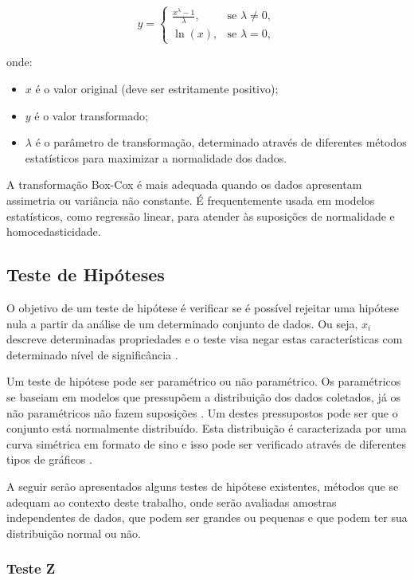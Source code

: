 \[
y = 
\begin{cases} 
\frac{x^\lambda - 1}{\lambda}, & \text{se } \lambda \neq 0, \\
\ln(x), & \text{se } \lambda = 0,
\end{cases}
\]

\noindent
onde:
\begin{itemize}
    \item \( x \) é o valor original (deve ser estritamente positivo);
    \item \( y \) é o valor transformado;
    \item \( \lambda \) é o parâmetro de transformação, determinado através de diferentes métodos estatísticos para maximizar a normalidade dos dados.
\end{itemize}

A transformação Box-Cox é mais adequada quando os dados apresentam assimetria ou variância não constante. É frequentemente usada em modelos estatísticos, como regressão linear, para atender às suposições de normalidade e homocedasticidade.


\subsection{Teste de Hipóteses}

O objetivo de um teste de hipótese é verificar se é possível rejeitar uma hipótese nula a partir da análise de um determinado conjunto de dados. Ou seja, \(x_i \) descreve determinadas propriedades e o teste visa negar estas características com determinado nível de significância \cite{wohlin_experimentation_2012}. 

Um teste de hipótese pode ser paramétrico ou não paramétrico. Os paramétricos se baseiam em modelos que pressupõem a distribuição dos dados coletados, já os não paramétricos não fazem suposições \cite{juristo_basics_2001}. Um destes pressupostos pode ser que o conjunto está normalmente distribuído. Esta distribuição é caracterizada por uma curva simétrica em formato de sino e isso pode ser verificado através de diferentes tipos de gráficos \cite{wohlin_experimentation_2012}.

A seguir serão apresentados alguns testes de hipótese existentes, métodos que se adequam ao contexto deste trabalho, onde serão avaliadas amostras independentes de dados, que podem ser grandes ou pequenas e que podem ter sua distribuição normal ou não.

\subsubsection{Teste Z}

